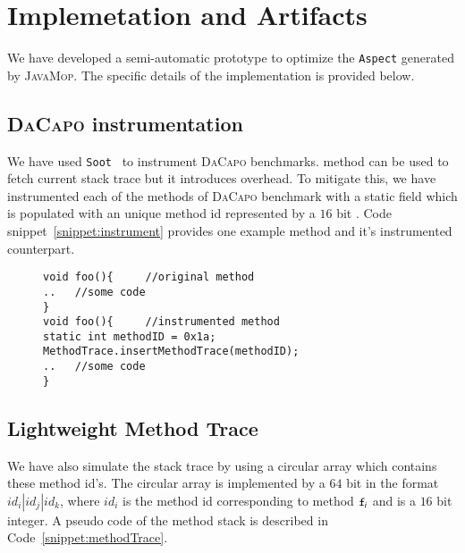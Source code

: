 \section{Implemetation and Artifacts}
\label{sec:implementation}

We have developed a semi-automatic prototype to optimize the \texttt{Aspect}
generated by \textsc{JavaMop}. The specific details of the implementation is
provided below.



\subsection{\textsc{DaCapo} instrumentation} 
\label{subsec:dacapoInstr}

We have used \texttt{Soot}~\cite{soot} to
instrument \textsc{DaCapo} benchmarks.  method can be used to
fetch current stack trace but it introduces overhead. To mitigate this, we have
instrumented each of the methods of \textsc{DaCapo} benchmark with a static
 field which is populated with an unique method id represented by
a $16$ bit . Code snippet~\ref{snippet:instrument} provides one
example method and it's instrumented counterpart.

 \begin{figure}[t]
\begin{lstlisting}
void foo(){		//original method
..   //some code
}
void foo(){		//instrumented method
static int methodID = 0x1a;
MethodTrace.insertMethodTrace(methodID);
..   //some code
}
\end{lstlisting}
\end{figure}

\subsection{Lightweight Method Trace}
\label{subsec:trace}

We have also simulate the stack trace by using a
circular array which contains these method id's. The circular array is
implemented by a $64$ bit  in the format $id_i|id_j|id_k$, where
$id_i$ is the method id corresponding to method $\code{f}_i$ and is a $16$ bit
integer. A pseudo code of the method stack is described in
Code~\ref{snippet:methodTrace}.

